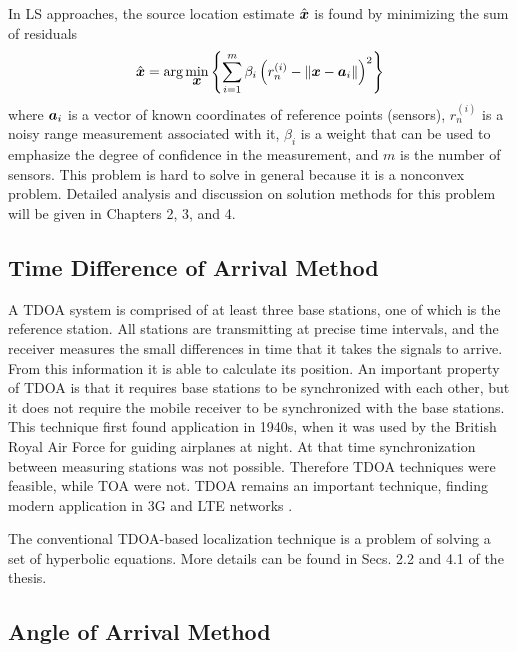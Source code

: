In LS approaches, the source location estimate $\hat{\mbox{\boldmath$x$}}$ is found by minimizing the sum of residuals \cite{GeoLoc}
\begin{equation}
\nonumber
\hat{\mbox{\boldmath$x$}} = \mbox{arg}\min_{\mbox{\boldmath$x$}} \left\lbrace \sum_{i=1}^m \beta_i\left(r_n^{(i)} - \|\mbox{\boldmath$x$} - \mbox{\boldmath$a$}_i\|\right)^2 \right\rbrace
\end{equation}
where $\mbox{\boldmath$a$}_i$ is a vector of known coordinates of reference points (sensors),   $r_n^{(i)}$ is a noisy range measurement associated with it, $\beta_i$ is a weight
that can be used to emphasize  the degree of confidence in the measurement, and $m$ is the number of sensors. This problem is hard to solve in general because it is a nonconvex problem. Detailed analysis and discussion on solution methods for this problem will be given in Chapters 2, 3, and 4.


\subsection{Time Difference of Arrival Method}

A TDOA system is comprised of at least three base stations, one of which is the reference station. All stations are transmitting at precise time intervals, and the receiver measures the small differences in time that it takes the signals to arrive. From this information it is able to calculate its position. 
An important property of TDOA is that it requires base stations to be synchronized with each other, but it does not require the mobile receiver to be synchronized with the base stations. This technique first found application
in 1940s, when it was used by the British Royal Air Force for guiding airplanes at night. At that time synchronization between measuring stations was not possible. Therefore TDOA techniques were feasible, while TOA were not. TDOA remains an important technique, finding modern application in 3G and LTE networks \cite{Ascom}.


The conventional TDOA-based localization technique is a problem of solving a set of hyperbolic equations. More details can be found in Secs. 2.2 and 4.1 of the thesis.

\subsection{Angle of Arrival Method}

